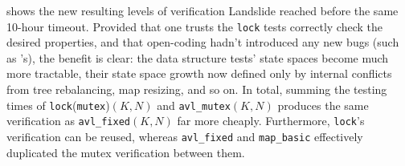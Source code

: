  shows the new resulting levels of verification
Landslide reached before the same 10-hour timeout.
Provided that one trusts the {\tt lock} tests correctly check the desired properties,
and that open-coding hadn't introduced any new bugs (such as 's),
the benefit is clear:
the data structure tests' state spaces become much more tractable,
their state space growth now defined only by internal conflicts from tree rebalancing, map resizing, and so on.
In total,
summing the testing times of {\tt lock}({\tt mutex})$(K,N)$ and {\tt avl\_mutex}$(K,N)$
produces the same verification as {\tt avl\_fixed}$(K,N)$ far more cheaply.
Furthermore, {\tt lock}'s verification can be reused,
whereas {\tt avl\_fixed} and {\tt map\_basic} effectively duplicated the mutex verification between them.

